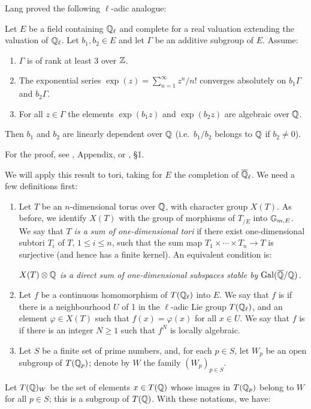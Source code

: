 Lang proved the following $\ell$-adic analogue:
\begin{prop}\label{prop:III_33_1}
Let $E$ be a field containing $\mathbb{Q}_\ell$ and complete for a real valuation
extending the valuation of $\mathbb{Q}_\ell$. Let $b_1, b_2 \in E$ and let $\Gamma$ be
an additive subgroup of $E$. Assume:
\begin{enumerate}
	\item $\Gamma$ is of rank at least 3 over $\mathbb{Z}$.
	\item The exponential series $\exp(z) = \sum_{n=1}^{\infty} z^n/n!$
		converges absolutely on $b_1 \Gamma$ and $b_2 \Gamma$.
	\item For all $z \in \Gamma$ the elements $\exp(b_1z)$ and $\exp(b_2z)$ are
	algebraic over $\mathbb{Q}$.
\end{enumerate}
Then $b_1$ and $b_2$ are linearly dependent over $\mathbb{Q}$ (i.e.\ $b_1/b_2$ belongs
to $\mathbb{Q}$ if $b_2 \ne 0$).
\end{prop}
For the proof, see \cite{15}, Appendix, or \cite{30}, \S 1.

We will apply this result to tori, taking for $E$ the completion
of $\overline{\mathbb{Q}}_\ell$. We need a few definitions first:
\begin{enumerate}[a/]
\item Let $T$ be an $n$-dimensional torus over $\mathbb{Q}$, with character
	group $X(T)$. As before, we identify $X(T)$ with the group of morphisms
	of $T_{/E}$ into $\mathbb{G}_{m, E}$. We say that \emph{$T$ is a sum of
	one-dimensional tori} if there exist one-dimensional subtori $T_i$ of
	$T$, $1 \le i \le n$, such that the sum map $T_1 \times \cdots \times
	T_n \to T$ is surjective (and hence has a finite kernel). An equivalent
	condition is:
	\begin{displayquote}
		\slshape
		$X(T) \otimes \mathbb{Q}$ is a direct sum of one-dimensional
		\dpage
		subspaces stable by $\operatorname{Gal}(\overline{\mathbb{Q}}/\mathbb{Q})$.
	\end{displayquote}

\item Let $f$ be a continuous homomorphism of $T(\mathbb{Q}_\ell)$ into $E$. We say
	that $f$ is  if there is a neighbourhood $U$ of 1 in the $\ell$-adic
	Lie group $T(\mathbb{Q}_\ell)$, and an element $\varphi \in X(T)$ such that
	$f(x) = \varphi(x)$ for all $x \in U$. We say that $f$ is
	 if there is an integer $N \ge 1$ such that $f^N$ is
	locally algebraic.

\item Let $S$ be a finite set of prime numbers, and, for each $p \in S$, let
	$W_p$ be an open subgroup of $T(\mathbb{Q}_p)$; denote by $W$ the family
	$(W_p)_{p\in S}$.
\end{enumerate}
Let $T(\mathbb{Q})_W$ be the set of elements $x \in T(\mathbb{Q})$ whose images in
$T(\mathbb{Q}_p)$ belong to $W$ for all $p \in S$; this is a subgroup of $T(\mathbb{Q})$.
With these notations, we have:

